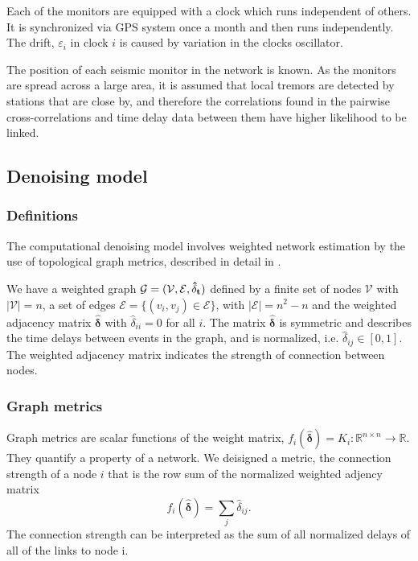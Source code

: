 \documentclass[12pt,a4paper,english]{article}
\begin{document}
Each of the monitors are equipped with a clock which runs independent of others. It is synchronized via GPS system once a month and then runs independently. The drift, $\varepsilon_i$ in clock $i$ is caused by variation in the clocks oscillator.  

The position of each seismic monitor in the network is known. As the monitors are spread across a large area, it is assumed that local tremors are detected by stations that are close by, and therefore the correlations found in the pairwise cross-correlations and time delay data between them have higher likelihood to be linked. 

\subsection{Denoising model}\label{sec:denoising}
\subsubsection{Definitions}
The computational denoising model involves weighted network estimation by the use of topological graph metrics, described in detail in \cite{Spyrou2017}. 

We have a weighted graph $\mathcal{G} = (\mathcal{V}, \mathcal{E}, \bf{\hat{\delta}}_t)$ defined by a finite set of nodes $\mathcal{V}$ with $|\mathcal{V}| = n$, a set of edges $\mathcal{E} = \{ (v_i,v_j) \in \mathcal{E} \}$, with $|\mathcal{E}| = n^2-n$ and the weighted adjacency matrix $\bm{\hat{\delta}}$ with $\hat{\delta}_{ii} = 0$ for all $i$. The matrix $\bm{\hat{\delta}}$  is symmetric and describes the time delays between events in the graph, and is normalized, i.e. $\hat{\delta}_{ij}\in [0,1]$. The weighted adjacency matrix indicates the strength of connection between nodes. %

\subsubsection{Graph metrics}
Graph metrics are scalar functions of the weight matrix, $f_i(\bm{\hat{\delta}})=K_i: \mathbb{R}^{n \times n}\rightarrow \mathbb{R}$. They quantify a property of a network. We deisigned a metric, the connection strength of a node $i$ that is the row sum of the normalized weighted adjency matrix 
\begin{equation}
f_i (\bm{\hat{\delta}})= \sum_j{\hat{\delta}_{ij}}.  
\end{equation}
The connection strength can be interpreted as the sum of all normalized delays of all of the links to node i.
\end{document}
